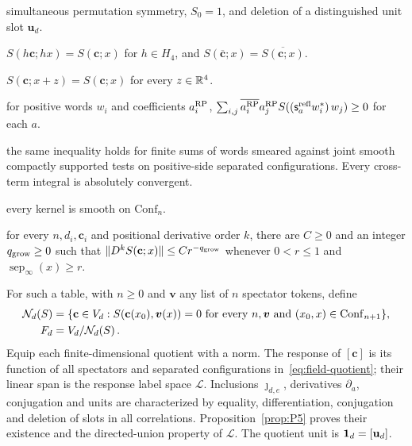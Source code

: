 \begin{definition}
\begin{description}[font=\normalfont,leftmargin=3.8em,labelindent=0pt,nosep]
\item[E1.] simultaneous permutation symmetry, $S_0=1$, and deletion of a distinguished unit slot $\mathbf u_d$.
\item[E2.] $S(h\mathbf c;hx)=S(\mathbf c;x)$ for $h\in H_4$, and $S(\overline{\mathbf c};x)=\overline{S(\mathbf c;x)}$.
\item[E3.] $S(\mathbf c;x+z)=S(\mathbf c;x)$ for every $z\in\mathbb{R}^4$.
\item[E4.] for positive words $w_i$ and coefficients $a_i^{\rm RP}$, $\sum_{i,j}\overline{a_i^{\rm RP}}a_j^{\rm RP}S((\mathsf s_a^{\rm refl}w_i^*)\,w_j)\ge0$ for each $a$.
\item[E5.] the same inequality holds for finite sums of words smeared against joint smooth compactly supported tests on positive-side separated configurations. Every cross-term integral is absolutely convergent.
\item[E6.] every kernel is smooth on $\mathrm{Conf}_n$.
\item[E7.] for every $n,d_i,\mathbf c_i$ and positional derivative order $k$, there are $C\ge0$ and an integer $q_{\rm grow}\ge0$ such that $\|D^kS(\mathbf c;x)\|\le Cr^{-q_{\rm grow}}$ whenever $0<r\le1$ and $\operatorname{sep}_\infty(x)\ge r$.
\end{description}
For such a table, with $n\ge0$ and $\boldsymbol v$ any list of $n$ spectator tokens, define
\begin{equation}\label{eq:field-quotient}
\begin{split}
\mathcal{N}_{d}(S)&=\{\mathbf c\in V_d:S(\mathbf c(x_0),\boldsymbol v(x))=0\text{ for every }n,\boldsymbol v\text{ and }(x_0,x)\in\mathrm{Conf}_{n+1}\},\\
F_d&=V_d/\mathcal{N}_{d}(S)\,.
\end{split}
\end{equation}
Equip each finite-dimensional quotient with a norm. The response of $[\mathbf c]$ is its function of all spectators and separated configurations in~\eqref{eq:field-quotient}; their linear span is the response label space $\mathcal L$. Inclusions $\jmath_{d,e}$, derivatives $\partial_a$, conjugation and units are characterized by equality, differentiation, conjugation and deletion of slots in all correlations. Proposition~\ref{prop:P5} proves their existence and the directed-union property of $\mathcal L$. The quotient unit is $\mathbf{1}_{d}=[\mathbf u_d]$.
\end{definition}


